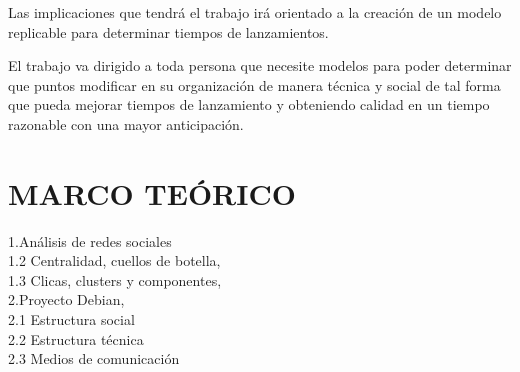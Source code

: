 \documentclass[12pt]{report}
\begin{document}
Las implicaciones que tendrá el trabajo irá orientado a la creación de
un modelo replicable para determinar tiempos de lanzamientos.

El trabajo va dirigido a toda  persona que necesite modelos para poder
determinar que puntos modificar en su organización de manera técnica y
social  de  tal forma  que  pueda  mejorar  tiempos de  lanzamiento  y
obteniendo calidad en un tiempo razonable con una mayor anticipación.

\chapter*{MARCO TEÓRICO}
1.Análisis de redes  sociales \\ 
1.2 Centralidad,  cuellos de botella,\\ 
1.3  Clicas, clusters y  componentes, \\ 
2.Proyecto Debian,  \\ 
2.1 Estructura  social  \\  
2.2  Estructura   técnica  \\  
2.3  Medios  de comunicación \\
\end{document}
